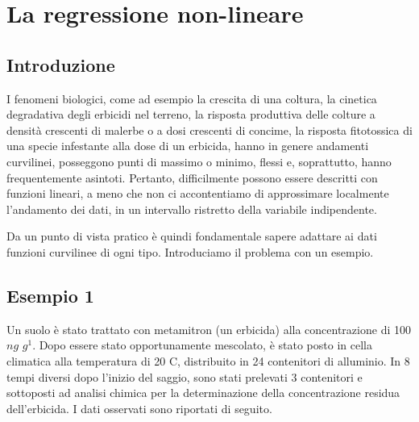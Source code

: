 \documentclass[a4paper,12pt,oneside]{book}
\newenvironment{Shaded}{\begin{snugshade}}{\end{snugshade}}
\newcommand{\KeywordTok}[1]{\textcolor[rgb]{0.13,0.29,0.53}{\textbf{#1}}}
\newcommand{\DataTypeTok}[1]{\textcolor[rgb]{0.13,0.29,0.53}{#1}}
\newcommand{\StringTok}[1]{\textcolor[rgb]{0.31,0.60,0.02}{#1}}
\newcommand{\OperatorTok}[1]{\textcolor[rgb]{0.81,0.36,0.00}{\textbf{#1}}}
\newcommand{\NormalTok}[1]{#1}
\theoremstyle{definition}
\theoremstyle{definition}
\theoremstyle{definition}
\theoremstyle{remark}
\begin{document}
\begin{Shaded}
\end{Shaded}

\chapter{La regressione non-lineare}\label{la-regressione-non-lineare}

\section{Introduzione}\label{introduzione-6}

I fenomeni biologici, come ad esempio la crescita di una coltura, la
cinetica degradativa degli erbicidi nel terreno, la risposta produttiva
delle colture a densità crescenti di malerbe o a dosi crescenti di
concime, la risposta fitotossica di una specie infestante alla dose di
un erbicida, hanno in genere andamenti curvilinei, posseggono punti di
massimo o minimo, flessi e, soprattutto, hanno frequentemente asintoti.
Pertanto, difficilmente possono essere descritti con funzioni lineari, a
meno che non ci accontentiamo di approssimare localmente l'andamento dei
dati, in un intervallo ristretto della variabile indipendente.

Da un punto di vista pratico è quindi fondamentale sapere adattare ai
dati funzioni curvilinee di ogni tipo. Introduciamo il problema con un
esempio.

\section{Esempio 1}\label{esempio-1-2}

Un suolo è stato trattato con metamitron (un erbicida) alla
concentrazione di 100 \(ng \,\, g^1\). Dopo essere stato opportunamente
mescolato, è stato posto in cella climatica alla temperatura di 20
\textdegree C, distribuito in 24 contenitori di alluminio. In 8 tempi
diversi dopo l'inizio del saggio, sono stati prelevati 3 contenitori e
sottoposti ad analisi chimica per la determinazione della concentrazione
residua dell'erbicida. I dati osservati sono riportati di seguito.
\end{document}
